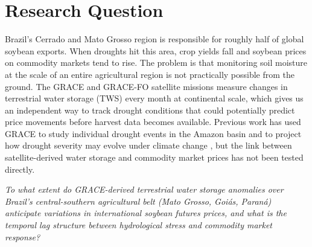 \documentclass[6pt, twocolumn]{article}
\begin{document}

\section{Research Question}
\label{sec:rq}

Brazil's Cerrado and Mato Grosso region is responsible for roughly
half of global soybean exports. When droughts hit this area, crop
yields fall and soybean prices on commodity markets tend to rise.
The problem is that monitoring soil moisture at the scale of an
entire agricultural region is not practically possible from the
ground. The GRACE and GRACE-FO satellite missions \cite{tapley2004grace, landerer2020extending} measure changes
in terrestrial water storage (TWS) every month at continental scale,
which gives us an independent way to track drought conditions that
could potentially predict price movements before harvest data
becomes available. Previous work has used GRACE to study individual drought events in the Amazon basin \cite{chen2010amazon} and to project how drought severity may evolve under climate change \cite{pokhrel2021global}, but the link between satellite-derived water storage and commodity market prices has not been tested directly.

\begin{tcolorbox}[boxstyle, title=Research Question]
  \textit{To what extent do GRACE-derived terrestrial water storage
  anomalies over Brazil's central-southern agricultural belt
  (Mato Grosso, Goiás, Paraná) anticipate variations in
  international soybean futures prices, and what is the temporal
  lag structure between hydrological stress and commodity market
  response?}
\end{tcolorbox}
\end{document}
